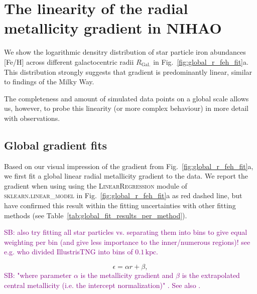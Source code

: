 \documentclass[fleqn,usenatbib]{mnras}
\newcommand{\SB}[1]{{\textcolor{purple}{SB: #1}}}
\begin{document}
\section{The linearity of the radial metallicity gradient in NIHAO}
\label{sec:linear_radial_metallicity_gradients}

We show the logarithmic densitry distribution of star particle iron abundances [Fe/H] across different galactocentric radii $R_\mathrm{Gal.}$ in Fig.~\ref{fig:global_r_feh_fit}a. This distribution strongly suggests that gradient is predominantly linear, similar to findings of the Milky Way.

The completeness and amount of simulated data points on a global scale allows us, however, to probe this linearity (or more complex behaviour) in more detail with observations.

\subsection{Global gradient fits}



Based on our visual impression of the gradient from Fig.~\ref{fig:global_r_feh_fit}a, we first fit a global linear radial metallicity gradient to the data. We report the gradient when using using the \textsc{LinearRegression} module of \textsc{sklearn.linear\_model} \citep{scikit-learn} in Fig.~\ref{fig:global_r_feh_fit}a as red dashed line, but have confirmed this result within the fitting uncertainties with other fitting methods (see Table~\ref{tab:global_fit_results_per_method}).

\SB{also try fitting all star particles vs. separating them into bins to give equal weighting per bin (and give less importance to the inner/numerous regions)! see e.g. \citet{Hemler2021} who divided IllustrisTNG into bins of $0.1\,\mathrm{kpc}$.}

\begin{equation}
    \epsilon = \alpha r + \beta,
\end{equation}
\SB{"where parameter $\alpha$ is the metallicity gradient and $\beta$ is the extrapolated central metallicity (i.e. the intercept normalization)" \citep{Hemler2021}. See also \citet{Ma2017b}.}
\end{document}
